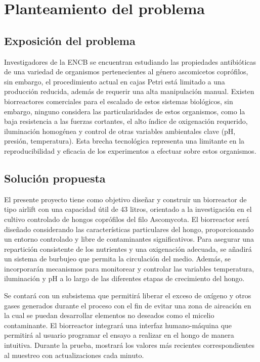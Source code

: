 \chapter{Planteamiento del problema}\label{cap6}

\section{Exposición del problema}

Investigadores de la ENCB se encuentran estudiando las propiedades antibióticas
de una variedad de organismos pertenecientes al género ascomicetos coprófilos,
sin embargo, el procedimiento actual en cajas Petri está limitado a una producción
reducida, además de requerir una alta manipulación manual. Existen biorreactores
comerciales para el escalado de estos sistemas biológicos, sin embargo, ninguno
considera las particularidades de estos organismos, como la baja resistencia a las
fuerzas cortantes, el alto índice de oxigenación requerido, iluminación homogénea
y control de otras variables ambientales clave (pH, presión, temperatura). Esta
brecha tecnológica representa una limitante en la reproducibilidad y eficacia de los
experimentos a efectuar sobre estos organismos.

\section{Solución propuesta}

El presente proyecto tiene como objetivo diseñar y construir un biorreactor de tipo
airlift con una capacidad útil de 43 litros, orientado a la investigación en el cultivo
controlado de hongos coprófilos del filo Ascomycota. El biorreactor será diseñado
considerando las características particulares del hongo, proporcionando un entorno
controlado y libre de contaminantes significativos. Para asegurar una repartición
consistente de los nutrientes y una oxigenación adecuada, se añadirá un sistema
de burbujeo que permita la circulación del medio. Además, se incorporarán
mecanismos para monitorear y controlar las variables temperatura, iluminación y
pH a lo largo de las diferentes etapas de crecimiento del hongo.

Se contará con un subsistema que permitirá liberar el exceso de oxígeno y otros
gases generados durante el proceso con el fin de evitar una zona de aireación en
la cual se puedan desarrollar elementos no deseados como el micelio
contaminante. El biorreactor integrará una interfaz humano-máquina que permitirá
al usuario programar el ensayo a realizar en el hongo de manera intuitiva. Durante
la prueba, mostrará los valores más recientes correspondientes al muestreo con
actualizaciones cada minuto.

